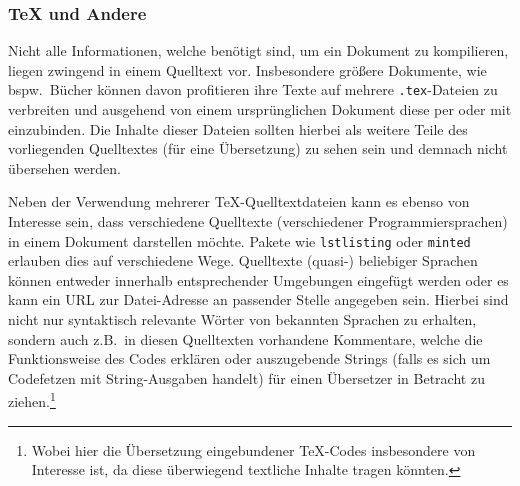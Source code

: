 \subsubsection{\TeX{} und Andere}
Nicht alle Informationen, welche benötigt sind, um ein Dokument zu kompilieren, liegen zwingend in einem Quelltext vor. Insbesondere größere Dokumente, wie bspw.\ Bücher können davon profitieren ihre Texte auf mehrere \verb|.tex|-Dateien zu verbreiten und ausgehend von einem ursprünglichen Dokument diese per \verb|| oder \verb|| mit einzubinden. Die Inhalte dieser Dateien sollten hierbei als weitere Teile des vorliegenden Quelltextes (für eine Übersetzung) zu sehen sein und demnach nicht übersehen werden.%
\begin{comment}
    - Kurzfassung - 
    Datei 1:
        \documentclass{article}
        \title{sample}
        
        
        
        
    Datei sample.tex:
        Will i be translated?

    Erwarteter Output:
        Werde ich übersetzt?
        (nächste Seite)
        Werde ich übersetzt?
\end{comment}

Neben der Verwendung mehrerer \TeX{}-Quelltextdateien kann es ebenso von Interesse sein, dass verschiedene Quelltexte (verschiedener Programmiersprachen) in einem Dokument darstellen möchte. Pakete wie \texttt{lstlisting} oder \texttt{minted} erlauben dies auf verschiedene Wege. Quelltexte (quasi-) beliebiger Sprachen können entweder innerhalb entsprechender Umgebungen eingefügt werden oder es kann ein URL zur Datei-Adresse an passender Stelle angegeben sein. Hierbei sind nicht nur syntaktisch relevante Wörter von bekannten Sprachen zu erhalten, sondern auch z.B.\ in diesen Quelltexten vorhandene Kommentare, welche die Funktionsweise des Codes erklären oder auszugebende Strings (falls es sich um Codefetzen mit String-Ausgaben handelt) für einen Übersetzer in Betracht zu ziehen.\footnote{Wobei hier die Übersetzung eingebundener \TeX{}-Codes insbesondere von Interesse ist, da diese überwiegend textliche Inhalte tragen könnten.}


